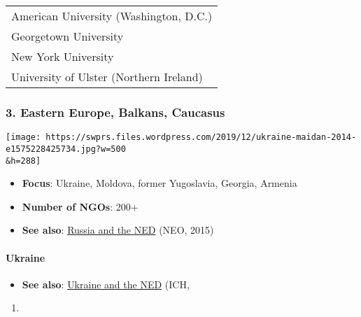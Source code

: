 \begin{longtable}[]{@{}l@{}}
\toprule
\endhead
American University (Washington, D.C.)\tabularnewline
Georgetown University\tabularnewline
New York University\tabularnewline
University of Ulster (Northern Ireland)\tabularnewline
\bottomrule
\end{longtable}

\hypertarget{3-eastern-europe-balkans-caucasus}{%
\subsubsection{3. Eastern Europe, Balkans,
Caucasus}\label{3-eastern-europe-balkans-caucasus}}

\texttt{[image: https://swprs.files.wordpress.com/2019/12/ukraine-maidan-2014-e1575228425734.jpg?w=500\\\&h=288]}

\begin{itemize}
\tightlist
\item
  \textbf{Focus}: Ukraine, Moldova, former Yugoslavia, Georgia, Armenia
\item
  \textbf{Number of NGOs}: 200+
\item
  \textbf{See also}:
  \href{https://journal-neo.org/2015/08/03/national-endowment-for-democracy-is-now-officially-undesirable-in-russia/}{Russia
  and the NED} (NEO, 2015)
\end{itemize}

\hypertarget{ukraine}{%
\paragraph{Ukraine}\label{ukraine}}

\begin{itemize}
\tightlist
\item
  \textbf{See also}:
  \href{https://www.21cir.com/2014/02/since-1991-us-invested-5-billion-in-the-development-of-democratic-institutions-in-other-words-regime-change-in-kiev/}{Ukraine
  and the NED} (ICH,
\end{itemize}

\begin{enumerate}
\def\labelenumi{\arabic{enumi})}
\setcounter{enumi}{2013}
\item
\end{enumerate}

